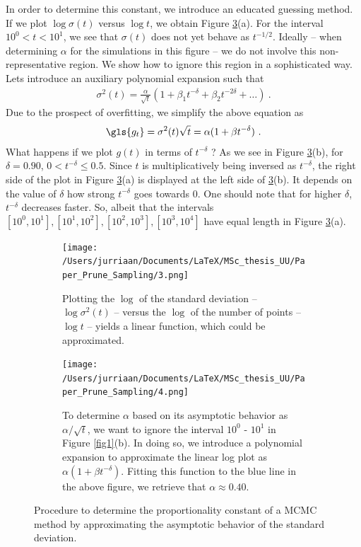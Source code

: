 \documentclass[a4paper, twoside, 11pt]{report}
\theoremstyle{plain}
\theoremstyle{definition}
\theoremstyle{remark}
\begin{document}
In order to determine this constant, we introduce an educated guessing method. If we plot $\log \sigma(t)$ versus $\log t$, we obtain Figure \ref{fig2}(a). For the interval $10^0 < t < 10^1$, we see that $\sigma(t)$ does not yet behave as $t^{-1/2}$. Ideally -- when determining $\alpha$ for the simulations in this figure -- we do not involve this non-representative region. We show how to ignore this region in a sophisticated way. Lets introduce an auxiliary polynomial expansion such that
\begin{align*}
{\sigma}^2(t) = \frac{\alpha}{\sqrt{t}}(1+\beta_1 t^{-\delta} + \beta_2 t^{-2\delta} + \ldots )\ .
\end{align*}
Due to the prospect of overfitting, we simplify the above equation as
\begin{align}
\gls{g_t} = {\sigma}^2(t) \sqrt{t} = \alpha(1+ \beta t^{-\delta})\ .
\label{poly-expan}
\end{align}
What happens if we plot $g(t)$ in terms of $t^{-\delta}$ ? As we see in Figure \ref{fig2}(b), for $\delta =0.90$, $0 < t^{-\delta} \leq 0.5$. Since $t$ is multiplicatively being inversed as $t^{-\delta}$, the right side of the plot in Figure \ref{fig2}(a) is displayed at the left side of \ref{fig2}(b). It depends on the value of $\delta$ how strong $t^{-\delta}$ goes towards $0$. One should note that for higher $\delta$, $t^{-\delta}$ decreases faster. So, albeit that the intervals $[10^0,10^1], [10^1,10^2], [10^2,10^3], [10^3,10^4]$ have equal length in Figure \ref{fig2}(a). 
\begin{figure}[H]
\begin{subfigure}[t]{0.5\textwidth}
  \centering
  \captionsetup{width = 0.9\textwidth}
  \texttt{[image: /Users/jurriaan/Documents/LaTeX/MSc\_thesis\_UU/Paper\_Prune\_Sampling/3.png]}
  \caption{Plotting the $\log$ of the standard deviation -- $\log {\sigma}^2(t)$ -- versus the $\log$ of the number of points -- $\log t$ -- yields a linear function, which could be approximated.}
  \label{sub_2a}
\end{subfigure}%
\begin{subfigure}[t]{0.5\textwidth}
  \centering
  \captionsetup{width = 0.9\textwidth}
  \texttt{[image: /Users/jurriaan/Documents/LaTeX/MSc\_thesis\_UU/Paper\_Prune\_Sampling/4.png]}
  \caption{To determine $\alpha$ based on its asymptotic behavior as $\alpha / \sqrt{t}$, we want to ignore the interval $10^0$ - $10^1$ in Figure \ref{fig1}(b). In doing so, we introduce a polynomial expansion to approximate the linear log plot as $\alpha(1+\beta t^{-\delta})$. Fitting this function to the blue line in the above figure, we retrieve that $\alpha \approx 0.40$. }
  \label{sub_2b}
\end{subfigure}
\caption{Procedure to determine the proportionality constant of a MCMC method by approximating the asymptotic behavior of the standard deviation.}
\label{fig2}
\end{figure}
\end{document}
